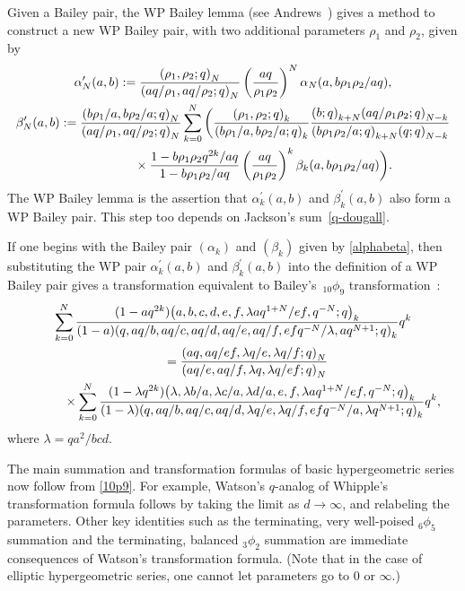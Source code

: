 \documentclass[pdftex]{sigma}
\numberwithin{equation}{section}
\newcommand{\qrfac}[2]{{\left({#1}; q\right)_{#2}}} %
\begin{document}
Given a Bailey pair, the WP Bailey lemma (see Andrews~\cite[Theorem~7]{Andrews2001}) gives a method to construct a new WP Bailey pair, with two additional parameters $\rho_1$ and $\rho_2$, given by
\begin{gather*}
{\alpha}^{\prime}_N(a,b) := \frac{\qrfac{\rho_1, \rho_2 }{N}}{\qrfac{aq/\rho_1, aq/\rho_2}{N}}
 \left(\frac{aq}{\rho_1\rho_2}\right)^{N} \alpha_N(a, b\rho_1\rho_2/aq),
\\
{\beta}^{\prime}_N (a,b) :=
\frac{\qrfac{b\rho_1/a , b\rho_2/a }{N}}{\qrfac{aq/\rho_1, aq/\rho_2}{N}}
 \sum_{k=0}^{N} \bigg(
\frac{ \qrfac{\rho_1, \rho_2}{k} }{\qrfac{b\rho_1/a, b\rho_2/a}{k}}
 \frac{\qrfac{b}{k+N}\qrfac{aq/\rho_1\rho_2}{N-k} }{\qrfac{b\rho_1\rho_2/a}{k+N}\qrfac{q}{N-k} }\\
\hphantom{{\beta}^{\prime}_N (a,b) :=}{} \times
 \frac{1- b\rho_1\rho_2q^{2k}/aq} { 1- b\rho_1\rho_2/aq}
 \left(\frac{aq}{\rho_1\rho_2}\right)^{k} \beta_k(a,b\rho_1\rho_2/aq)
 \bigg).%
\end{gather*}
The WP Bailey lemma is the assertion that ${\alpha}^{\prime}_k(a,b)$ and ${\beta}^{\prime}_k(a,b)$ also form a WP Bailey pair. This step too depends on Jackson's sum~\eqref{q-dougall}.

If one begins with the Bailey pair $(\alpha_k)$ and $(\beta_k)$ given by \eqref{alphabeta}, then substituting the WP pair ${\alpha}^{\prime}_k(a,b)$ and ${\beta}^{\prime}_k(a,b)$ into the definition of a WP Bailey pair gives a transformation equivalent to Bailey's~$_{10}\phi_9$ transformation~\cite[equation~(2.9.1)]{GR90}:
\begin{gather}
\sum_{k=0}^N \frac {(1-aq^{2k}) \qrfac{ a, b, c, d, e, f, \lambda aq^{1+N}/ef, q^{-N}}{k}}
{(1-a)\qrfac{q, aq/b, aq/c, aq/d, aq/e, aq/f, efq^{-N}/\lambda, aq^{N+1}}{k}}
q^k \notag\\
\qquad{} = \frac{\qrfac{aq, aq/ef, \lambda q/e,\lambda q/f}{N}} {\qrfac{aq/e, aq/f, \lambda q, \lambda q/ef}{N}}\notag\\
\qquad\quad{} \times\sum_{k=0}^N \frac {(1-\lambda q^{2k}) \qrfac{ \lambda, \lambda b/a, \lambda c/a, \lambda d/a, e, f,
\lambda aq^{1+N}/ef , q^{-N}}{k}} {(1-\lambda)\qrfac{q, aq/b, aq/c, aq/d, \lambda q/e , \lambda q/f, efq^{-N}/a, \lambda q^{N+1}}{k}}
q^k,\label{10p9}
\end{gather}
where $\lambda =qa^2/bcd$.

The main summation and transformation formulas of basic hypergeometric series now follow from \eqref{10p9}. For example, Watson's $q$-analog of Whipple's transformation formula follows by taking the limit as $d\to \infty$, and relabeling the parameters. Other key identities such as the terminating, very well-poised $_6\phi_5$ summation and the terminating, balanced $_3\phi_2$ summation are immediate consequences of Watson's transformation formula. (Note that in the case of elliptic hypergeometric series, one cannot let parameters go to $0$ or $\infty$.)
\end{document}
